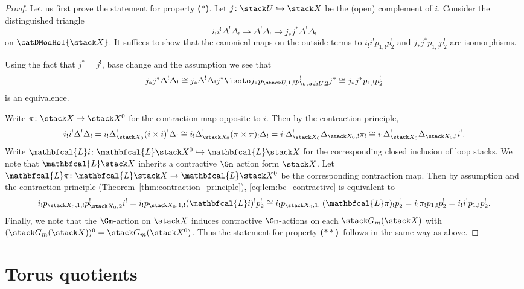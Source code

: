 \documentclass{ck-article}
\newcommand\bc{\textbf{($\mathbf{*}$)}}
\newcommand\hbc{\textbf{($\mathbf{**}$)}}
\renewcommand\ls[1]{\mathbfcal{L} #1}
\begin{document}
\begin{proof}
    Let us first prove the statement for property \bc.
    Let $j\colon \stack U \hookrightarrow \stack X$ be the (open) complement of $i$.
    Consider the distinguished triangle
    \[
        i_!i^! \Delta^!\Delta_! \to \Delta^!\Delta_! \to j_*j^*\Delta^!\Delta_!
    \]
    on $\catDModHol{\stack X}$.
    It suffices to show that the canonical maps on the outside terms to $i_!i^! p_{1,!}p_2^!$ and $j_*j^* p_{1,!}p_2^!$ are isomorphisms.
    
    Using the fact that $j^* = j^!$, base change and the assumption we see that
    \[
        j_*j^*\Delta^!\Delta_! \cong
        j_*\Delta^!\Delta_!j^* \isoto
        j_*p_{\stack U,1,!}p_{\stack U,2}^! j^* \cong
        j_*j^* p_{1,!}p_2^!
    \]
    is an equivalence.

    Write $\pi\colon \stack X \to \stack X^0$ for the contraction map opposite to $i$.
    Then by the contraction principle,
    \begin{equation}\label{eq:lem:bc_contractive}
        i_!i^! \Delta^!\Delta_! =
        i_!\Delta_{\stack X_0}^!(i\times i)^! \Delta_! \cong
        i_!\Delta_{\stack X_0}^!(\pi\times \pi)_! \Delta_! =
        i_!\Delta_{\stack X_0}^!\Delta_{\stack X_0,!} \pi_! \cong
        i_!\Delta_{\stack X_0}^!\Delta_{\stack X_0,!} i^!.
    \end{equation}
    Write $\ls i \colon \ls\stack X^0 \hookrightarrow \ls\stack X$ for the corresponding closed inclusion of loop stacks.
    We note that $\ls\stack X$ inherits a contractive $\Gm$ action form $\stack X$.
    Let $\ls \pi\colon \ls\stack X \to \ls\stack X^0$ be the corresponding contraction map.
    Then by assumption and the contraction principle (Theorem~\ref{thm:contraction_principle}), \eqref{eq:lem:bc_contractive} is equivalent to
    \[
        i_!p_{\stack X_0,1,!}p_{\stack X_0,2}^! i^! =
        i_!p_{\stack X_0,1,!} (\ls i)^! p_{2}^! \cong
        i_!p_{\stack X_0,1,!} (\ls \pi)_! p_{2}^! =
        i_! \pi_! p_{1,!} p_{2}^! =
        i_! i^! p_{1,!} p_{2}^!.
    \]
    Finally, we note that the $\Gm$-action on $\stack X$ induces contractive $\Gm$-actions on each $\stack G_m(\stack X)$ with $(\stack G_m(\stack X))^0 = \stack G_m(\stack X^0)$.
    Thus the statement for property \hbc\ follows in the same way as above.
\end{proof}

\section{Torus quotients}
\end{document}
